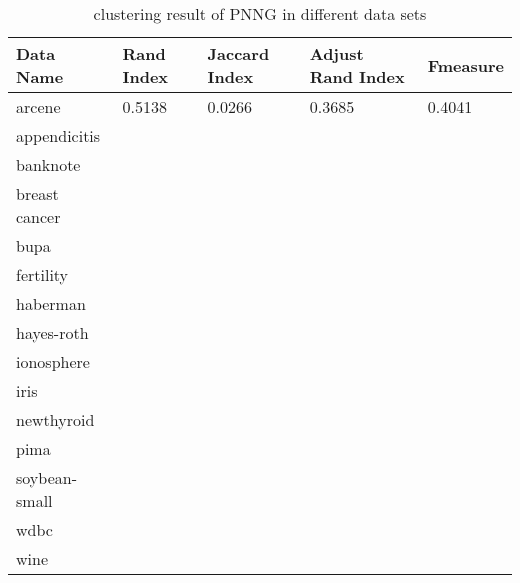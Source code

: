 	    \begin{table}[htb]
	      \centering
	      \caption{clustering result of PNNG in different data sets}
	      \label{my-label}
	      \begin{tabular}{|lllll|}
	        \hline
	         Data Name & Rand Index  & Jaccard Index  & Adjust Rand Index & F\-measure  \\ \hline
	         arcene         & 0.5138 & 0.0266 & 0.3685 & 0.4041  \\ 
	         appendicitis   &  & &  &  \\ 
	         banknote       &  & &  &  \\ 
	         breast cancer  &  & &  & \\ 
	         bupa           &  & &  &  \\ 
	         fertility      &  & &  & \\ 
	         haberman       &  & &  &  \\ 
	         hayes-roth     &  & &  & \\ 
	         ionosphere     &  & &  &  \\ 
	         iris           &  & &  & \\ 
	         newthyroid     &  & &  &  \\ 
	         pima           &  & &  & \\ 
	         soybean-small  &  & &  & \\ 
	         wdbc           &  & &  & \\ 
	         wine           &  & &  &  \\ 
	         \hline
	      \end{tabular}
	    \end{table} 

